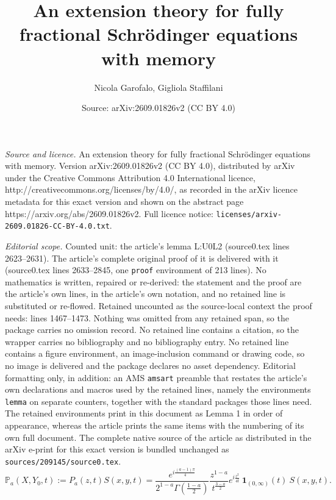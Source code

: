 \documentclass[10pt,a4paper]{amsart}
\title{An extension theory for fully fractional Schr\"odinger equations with memory}
\author{Nicola Garofalo, Gigliola Staffilani}
\date{Source: arXiv:2609.01826v2 (CC BY 4.0)}
\begin{document}
\maketitle

\noindent\emph{Source and licence.} An extension theory for fully fractional Schr\"odinger equations with memory. Version arXiv:2609.01826v2 (CC BY 4.0), distributed by arXiv under the Creative Commons Attribution 4.0 International licence, http://creativecommons.org/licenses/by/4.0/, as recorded in the arXiv licence metadata for this exact version and shown on the abstract page https://arxiv.org/abs/2609.01826v2. Full licence notice: \texttt{licenses/arxiv-2609.01826-CC-BY-4.0.txt}.\par\smallskip

\noindent\textit{Editorial scope.} Counted unit: the article's lemma L:U0L2 (source0.tex lines 2623--2631). The article's complete original proof of it is delivered with it (source0.tex lines 2633--2845, one \texttt{proof} environment of 213 lines). No mathematics is written, repaired or re-derived: the statement and the proof are the article's own lines, in the article's own notation, and no retained line is substituted or re-flowed.  Retained uncounted as the source-local context the proof needs: lines 1467--1473.  Nothing was omitted from any retained span, so the package carries no omission record.  No retained line contains a citation, so the wrapper carries no bibliography and no bibliography entry.  No retained line contains a figure environment, an image-inclusion command or drawing code, so no image is delivered and the package declares no asset dependency.  Editorial formatting only, in addition: an AMS \texttt{amsart} preamble that restates the article's own declarations and macros used by the retained lines, namely the environments \texttt{lemma} on separate counters, together with the standard packages those lines need.  The retained environments print in this document as Lemma 1 in order of appearance, whereas the article prints the same items with the numbering of its own full document.  The complete native source of the article as distributed in the arXiv e-print for this exact version is bundled unchanged as \texttt{sources/209145/source0.tex}.
\begin{equation}\label{Pa}
\mathbb P_a(X,Y_0,t) := P_a(z,t) S(x,y,t)
= \frac{e^{i\frac{(a-1)\pi}{4}}}
     {2^{1-a}\Gamma\!\left(\frac{1-a}{2}\right)}
\frac{z^{1-a}}{t^{\frac{3-a}{2}}}
e^{i\frac{z^2}{4t}}\ \mathbf 1_{(0,\infty)}(t)\ S(x,y,t).
\end{equation}
\end{document}
